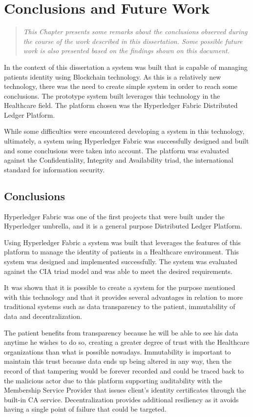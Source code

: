 \chapter{Conclusions and Future Work}
\label{Conclusion}

\begin{quote} \emph{This Chapter presents some remarks about the conclusions
  observed during the course of the work described in this dissertation. Some
  possible future work is also presented based on the findings shown on this
  document.} 
\end{quote}

In the context of this dissertation a system was built that is capable of
managing patients identity using Blockchain technology. As this is a relatively
new technology, there was the need to create simple system in order to reach
some conclusions. The prototype system built leverages this technology in the
Healthcare field. The platform chosen was the Hyperledger Fabric Distributed
Ledger Platform. 

While some difficulties were encountered developing a system in this
technology, ultimately, a system using Hyperledger Fabric was successfully
designed and built and some conclusions were taken into account. The platform
was evaluated against the Confidentiality, Integrity and Availability triad,
the international standard for information security.

\section{Conclusions}

Hyperledger Fabric was one of the first projects that were built under the
Hyperledger umbrella, and it is a general purpose Distributed Ledger Platform.

Using Hyperledger Fabric a system was built that leverages the features of this
platform to manage the identity of patients in a Healthcare environment. This
system was designed and implemented successfully. The system was evaluated
against the CIA triad model and was able to meet the desired requirements.

It was shown that it is possible to create a system for the purpose mentioned
with this technology and that it provides several advantages in relation to
more traditional systems such as data transparency to the patient, immutability
of data and decentralization.

The patient benefits from transparency because he will be able to see his data
anytime he wishes to do so, creating a greater degree of trust with the
Healthcare organizations than what is possible nowadays. Immutability is
important to maintain this trust because data ends up being altered in any way,
then the record of that tampering would be forever recorded and could be traced
back to the malicious actor due to this platform supporting auditability with
the Membership Service Provider that issues client's identity certificates
through the built-in CA service. Decentralization provides additional
resiliency as it avoids having a single point of failure that could be
targeted.

